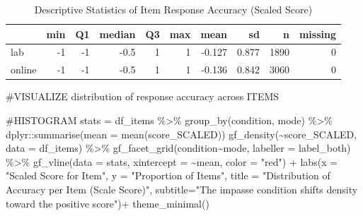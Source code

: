 \documentclass[
  letterpaper,
  DIV=11,
  numbers=noendperiod]{scrreprt}
\newenvironment{Shaded}{\begin{snugshade}}{\end{snugshade}}
\newcommand{\AttributeTok}[1]{\textcolor[rgb]{0.40,0.45,0.13}{#1}}
\newcommand{\CommentTok}[1]{\textcolor[rgb]{0.37,0.37,0.37}{#1}}
\newcommand{\FunctionTok}[1]{\textcolor[rgb]{0.28,0.35,0.67}{#1}}
\newcommand{\NormalTok}[1]{\textcolor[rgb]{0.00,0.23,0.31}{#1}}
\newcommand{\OtherTok}[1]{\textcolor[rgb]{0.00,0.23,0.31}{#1}}
\newcommand{\SpecialCharTok}[1]{\textcolor[rgb]{0.37,0.37,0.37}{#1}}
\newcommand{\StringTok}[1]{\textcolor[rgb]{0.13,0.47,0.30}{#1}}
\begin{document}
\begin{table}

\caption{Descriptive Statistics of Item Response Accuracy (Scaled Score)}
\centering
\begin{tabular}[t]{l|r|r|r|r|r|r|r|r|r}
\hline
  & min & Q1 & median & Q3 & max & mean & sd & n & missing\\
\hline
lab & -1 & -1 & -0.5 & 1 & 1 & -0.127 & 0.877 & 1890 & 0\\
\hline
online & -1 & -1 & -0.5 & 1 & 1 & -0.136 & 0.842 & 3060 & 0\\
\hline
\end{tabular}
\end{table}

\begin{Shaded}
\begin{Highlighting}[]
\CommentTok{\#VISUALIZE distribution of response accuracy across ITEMS}

\CommentTok{\#HISTOGRAM}
\NormalTok{stats }\OtherTok{=}\NormalTok{ df\_items }\SpecialCharTok{\%\textgreater{}\%} \FunctionTok{group\_by}\NormalTok{(condition, mode) }\SpecialCharTok{\%\textgreater{}\%}\NormalTok{ dplyr}\SpecialCharTok{::}\FunctionTok{summarise}\NormalTok{(}\AttributeTok{mean =} \FunctionTok{mean}\NormalTok{(score\_SCALED))}
\FunctionTok{gf\_density}\NormalTok{(}\SpecialCharTok{\textasciitilde{}}\NormalTok{score\_SCALED, }\AttributeTok{data =}\NormalTok{ df\_items) }\SpecialCharTok{\%\textgreater{}\%} 
  \FunctionTok{gf\_facet\_grid}\NormalTok{(condition}\SpecialCharTok{\textasciitilde{}}\NormalTok{mode, }\AttributeTok{labeller =}\NormalTok{ label\_both) }\SpecialCharTok{\%\textgreater{}\%} 
  \FunctionTok{gf\_vline}\NormalTok{(}\AttributeTok{data =}\NormalTok{ stats, }\AttributeTok{xintercept =} \SpecialCharTok{\textasciitilde{}}\NormalTok{mean, }\AttributeTok{color =} \StringTok{"red"}\NormalTok{) }\SpecialCharTok{+}
  \FunctionTok{labs}\NormalTok{(}\AttributeTok{x =} \StringTok{"Scaled Score for Item"}\NormalTok{,}
       \AttributeTok{y =} \StringTok{"Proportion of Items"}\NormalTok{,}
       \AttributeTok{title =} \StringTok{"Distribution of Accuracy per Item (Scale Score)"}\NormalTok{,}
       \AttributeTok{subtitle=}\StringTok{"The impasse condition shifts density toward the positive score"}\NormalTok{)}\SpecialCharTok{+}
  \FunctionTok{theme\_minimal}\NormalTok{()}
\end{Highlighting}
\end{Shaded}
\end{document}
